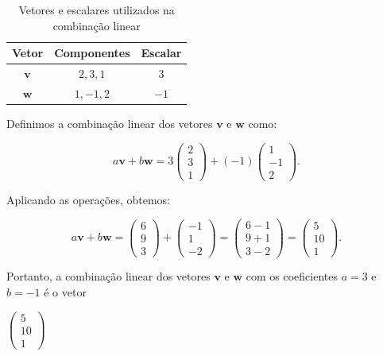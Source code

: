 \begin{table}[h]
	\centering
	\begin{tabular}{@{}ccc@{}}
		\toprule
		\textbf{Vetor} & \textbf{Componentes} & \textbf{Escalar} \\ \midrule
		$\mathbf{v}$   & $ 2, 3, 1$   & $3$              \\
		$\mathbf{w}$   & $ 1, -1, 2$  & $-1$             \\ \bottomrule
	\end{tabular}
	\caption{Vetores e escalares utilizados na combinação linear}
\end{table}

Definimos a combinação linear dos vetores $\mathbf{v}$ e $\mathbf{w}$ como:

\[
a\mathbf{v} + b\mathbf{w} = 3 \begin{pmatrix} 2 \\ 3 \\ 1 \end{pmatrix} + (-1) \begin{pmatrix} 1 \\ -1 \\ 2 \end{pmatrix}.
\]

Aplicando as operações, obtemos:

\[
a\mathbf{v} + b\mathbf{w} = \begin{pmatrix} 6 \\ 9 \\ 3 \end{pmatrix} + \begin{pmatrix} -1 \\ 1 \\ -2 \end{pmatrix} = \begin{pmatrix} 6 - 1 \\ 9 + 1 \\ 3 - 2 \end{pmatrix} = \begin{pmatrix} 5 \\ 10 \\ 1 \end{pmatrix}.
\]

Portanto, a combinação linear dos vetores $\mathbf{v}$ e $\mathbf{w}$ com os coeficientes $a = 3$ e $b = -1$ é o vetor 

\centerline{$\begin{pmatrix} 5 \\ 10 \\ 1 \end{pmatrix}$}

